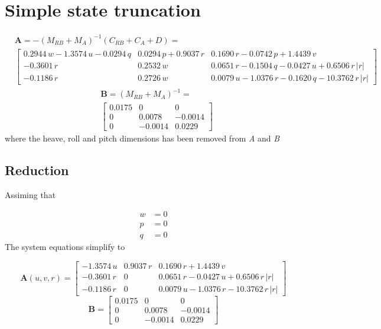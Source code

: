 \documentclass[12pt,a4]{article}
\begin{document}
\section{Simple state truncation}
\begin{align*}
	 & \bm{A} =  -(M_{RB} + M_A)^{-1}(C_{RB}+C_A+D)= \\
	 & \left[\begin{array}{ccc} 0.2944\,w-1.3574\,u-0.0294\,q & 0.0294\,p+0.9037\,r & 0.1690\,r-0.0742\,p+1.4439\,v\\ -0.3601\,r & 0.2532\,w & 0.0651\,r-0.1504\,q-0.0427\,u+0.6506\,r\,\left|r\right|\\ -0.1186\,r & 0.2726\,w & 0.0079\,u-1.0376\,r-0.1620\,q-10.3762\,r\,\left|r\right| \end{array}\right]
\end{align*}
\begin{align*}
	 & \bm{B} = (M_{RB} + M_A)^{-1}=           \\
	 & \left[\begin{array}{ccc} 0.0175 & 0 & 0\\ 0 & 0.0078 & -0.0014\\ 0 & -0.0014 & 0.0229 \end{array}\right]
\end{align*}
where the heave, roll and pitch dimensions has been removed from \textit{A} and \textit{B}

\subsection{Reduction}

Assiming that

\begin{align*}
	w & = 0 \\
	p & = 0 \\
	q & = 0
\end{align*}
The system equations simplify to

\begin{equation}
	\bm{A}(u,v,r) = \left[\begin{array}{ccc} -1.3574\,u & 0.9037\,r & 0.1690\,r+1.4439\,v\\ -0.3601\,r & 0 & 0.0651\,r-0.0427\,u+0.6506\,r\,\left|r\right|\\ -0.1186\,r & 0 & 0.0079\,u-1.0376\,r-10.3762\,r\,\left|r\right| \end{array}\right]
\end{equation}
\begin{equation}
	\bm{B} = \left[\begin{array}{ccc} 0.0175 & 0 & 0\\ 0 & 0.0078 & -0.0014\\ 0 & -0.0014 & 0.0229 \end{array}\right]
\end{equation}
\end{document}
